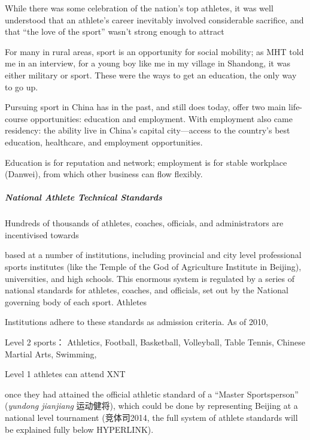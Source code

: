{While there was some celebration of the nation's top athletes, it was well understood that an athlete's career inevitably involved considerable sacrifice, and that ``the love of the sport'' wasn't strong enough to attract

For many in rural areas, sport is an opportunity for social mobility; as MHT told me in an interview, for a young boy like me in my village in Shandong, it was either military or sport.  These were the ways to get an education, the only way to go up.

Pursuing sport in China has in the past, and still does today, offer two main life-course opportunities: education and employment.  With employment also came residency: the ability live in China's capital city---access to the country's best education, healthcare, and employment opportunities.

Education is for reputation and network; employment is for stable workplace (Danwei), from which other business can flow flexibly.












\subparagraph{National Athlete Technical Standards}

Hundreds of thousands of athletes, coaches, officials, and administrators are incentivised towards

 based at a number of institutions, including provincial and city level professional sports institutes (like the Temple of the God of Agriculture Institute in Beijing), universities, and high schools.  This enormous system is regulated by a series of national standards for athletes, coaches, and officials, set out by the National governing body of each sport.  Athletes



 Institutions adhere to these standards as admission criteria.  As of 2010,



Level 2 sports：
Athletics, Football, Basketball, Volleyball, Table Tennis, Chinese Martial Arts, Swimming,

Level 1 athletes can attend XNT

once they had attained the official athletic standard of a ``Master Sportsperson'' (\textit{yundong jianjiang} 运动健将), which could be done by representing Beijing at a national level tournament (竞体司2014, the full system of athlete standards will be explained fully below HYPERLINK).






}
